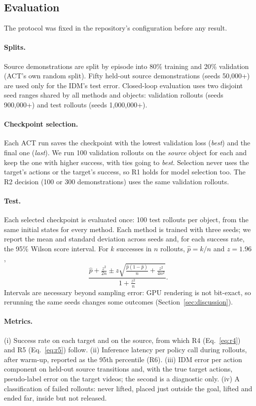 \documentclass{article}
\begin{document}
\subsection{Evaluation}
\label{sec:evaluation}
The protocol was fixed in the repository's configuration before any result.

\paragraph{Splits.}
Source demonstrations are split by episode into 80\% training and 20\% validation (ACT's
own random split). Fifty held-out source demonstrations (seeds 50,000+) are used only for
the IDM's test error. Closed-loop evaluation uses two disjoint seed ranges shared by
all methods and objects: validation rollouts (seeds 900,000+) and test rollouts (seeds
1,000,000+).

\paragraph{Checkpoint selection.}
Each ACT run saves the checkpoint with the lowest validation loss (\emph{best}) and the
final one (\emph{last}). We run 100 validation rollouts on the \emph{source} object for
each and keep the one with higher success, with ties going to \emph{best}. Selection
never uses the target's actions or the target's success, so R1 holds for model selection
too. The R2 decision (100 or 300 demonstrations) uses the same validation rollouts.

\paragraph{Test.}
Each selected checkpoint is evaluated once: 100 test rollouts per object, from the same
initial states for every method. Each method is trained with three seeds; we report
the mean and standard deviation across seeds and, for each success rate, the 95\% Wilson
score interval. For $k$ successes in $n$ rollouts, $\hat{p} = k/n$ and $z = 1.96$,
\begin{equation}
  \frac{\hat{p} + \frac{z^2}{2n} \pm z \sqrt{\frac{\hat{p}(1 - \hat{p})}{n} + \frac{z^2}{4n^2}}}{1 + \frac{z^2}{n}} .
\end{equation}
Intervals are necessary beyond sampling error: GPU rendering is not bit-exact, so
rerunning the same seeds changes some outcomes (Section~\ref{sec:discussion}).

\paragraph{Metrics.}
(i) Success rate on each target and on the source, from which R4 (Eq.~\ref{eq:r4}) and R5
(Eq.~\ref{eq:r5}) follow. (ii) Inference latency per policy call during rollouts, after
warm-up, reported as the 95th percentile (R6). (iii) IDM error per action component on
held-out source transitions and, with the true target actions, pseudo-label error on the
target videos; the second is a diagnostic only. (iv) A classification of failed rollouts:
never lifted, placed just outside the goal, lifted and ended far, inside but not
released.
\end{document}
